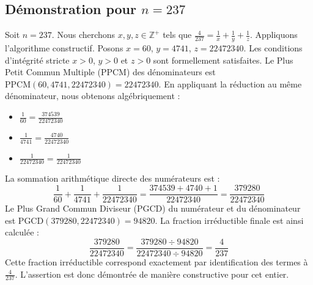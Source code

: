 \documentclass[11pt,a4paper]{article}
\begin{document}
\subsection{Démonstration pour $n = 237$}
Soit $n = 237$. Nous cherchons $x, y, z \in \mathbb{Z}^{+}$ tels que $\frac{4}{237} = \frac{1}{x} + \frac{1}{y} + \frac{1}{z}$.
Appliquons l'algorithme constructif. Posons $x = 60$, $y = 4741$, $z = 22472340$.
Les conditions d'intégrité stricte $x > 0$, $y > 0$ et $z > 0$ sont formellement satisfaites.
Le Plus Petit Commun Multiple (PPCM) des dénominateurs est $\text{PPCM}(60, 4741, 22472340) = 22472340$.
En appliquant la réduction au même dénominateur, nous obtenons algébriquement :
\begin{itemize}
    \item $\frac{1}{60} = \frac{374539}{22472340}$
    \item $\frac{1}{4741} = \frac{4740}{22472340}$
    \item $\frac{1}{22472340} = \frac{1}{22472340}$
\end{itemize}
La sommation arithmétique directe des numérateurs est :
$$ \frac{1}{60} + \frac{1}{4741} + \frac{1}{22472340} = \frac{374539 + 4740 + 1}{22472340} = \frac{379280}{22472340} $$
Le Plus Grand Commun Diviseur (PGCD) du numérateur et du dénominateur est $\text{PGCD}(379280, 22472340) = 94820$.
La fraction irréductible finale est ainsi calculée :
$$ \frac{379280}{22472340} = \frac{379280 \div 94820}{22472340 \div 94820} = \frac{4}{237} $$
Cette fraction irréductible correspond exactement par identification des termes à $\frac{4}{237}$. L'assertion est donc démontrée de manière constructive pour cet entier.
\end{document}
